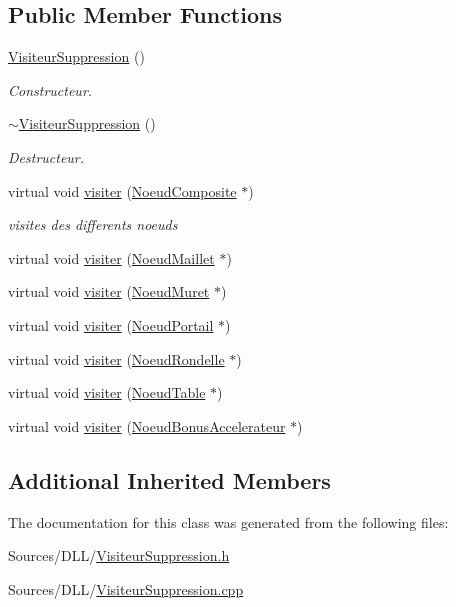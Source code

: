 \subsection*{Public Member Functions}
\begin{DoxyCompactItemize}
\item 
\hyperlink{group__inf2990_ga77790339ddd453ed30dffccef8934373}{Visiteur\+Suppression} ()
\begin{DoxyCompactList}\small\item\em Constructeur. \end{DoxyCompactList}\item 
\hyperlink{group__inf2990_ga609bdf7e42165bdfa8d4c4d816c2b71d}{$\sim$\+Visiteur\+Suppression} ()
\begin{DoxyCompactList}\small\item\em Destructeur. \end{DoxyCompactList}\item 
virtual void \hyperlink{group__inf2990_gae0fb11ee5dcb5859fd4e163b685b637f}{visiter} (\hyperlink{class_noeud_composite}{Noeud\+Composite} $\ast$)
\begin{DoxyCompactList}\small\item\em visites des differents noeuds \end{DoxyCompactList}\item 
virtual void \hyperlink{group__inf2990_ga16f8a5baaf97984aa643548b3d7fdb77}{visiter} (\hyperlink{class_noeud_maillet}{Noeud\+Maillet} $\ast$)
\item 
virtual void \hyperlink{group__inf2990_ga9c2fa9629828ea966b7f8823f3fc27f1}{visiter} (\hyperlink{class_noeud_muret}{Noeud\+Muret} $\ast$)
\item 
virtual void \hyperlink{group__inf2990_ga44d65975bdbc7e3d83171694ad8bd49f}{visiter} (\hyperlink{class_noeud_portail}{Noeud\+Portail} $\ast$)
\item 
virtual void \hyperlink{group__inf2990_ga583a45169e345e2262f8a572c32e7822}{visiter} (\hyperlink{class_noeud_rondelle}{Noeud\+Rondelle} $\ast$)
\item 
virtual void \hyperlink{group__inf2990_gae84d0ab8c7eb74a325d3da3a3629d0b3}{visiter} (\hyperlink{class_noeud_table}{Noeud\+Table} $\ast$)
\item 
virtual void \hyperlink{group__inf2990_ga16d27e0e09fbdfde27639965c71c415c}{visiter} (\hyperlink{class_noeud_bonus_accelerateur}{Noeud\+Bonus\+Accelerateur} $\ast$)
\end{DoxyCompactItemize}
\subsection*{Additional Inherited Members}


The documentation for this class was generated from the following files\+:\begin{DoxyCompactItemize}
\item 
Sources/\+D\+L\+L/\hyperlink{_visiteur_suppression_8h}{Visiteur\+Suppression.\+h}\item 
Sources/\+D\+L\+L/\hyperlink{_visiteur_suppression_8cpp}{Visiteur\+Suppression.\+cpp}\end{DoxyCompactItemize}
